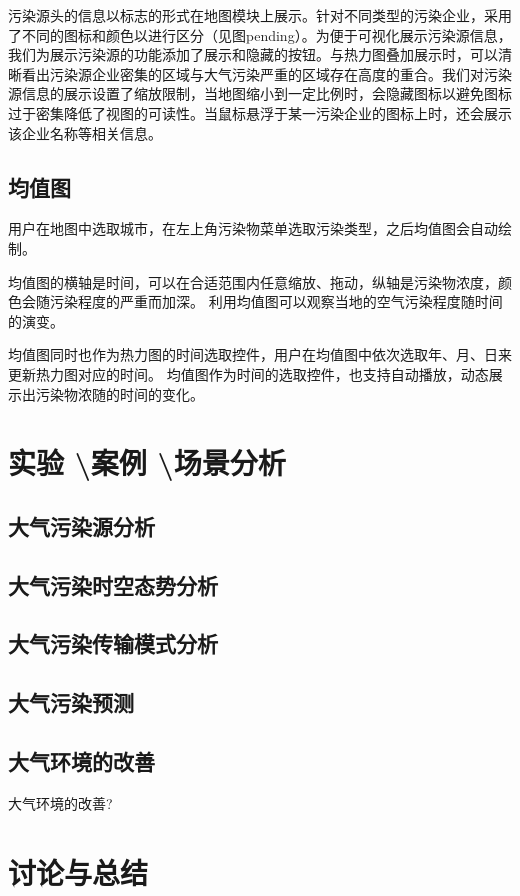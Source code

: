 \documentclass[UTF8]{ctexrep}
\begin{document}
    污染源头的信息以标志的形式在地图模块上展示。针对不同类型的污染企业，采用了不同的图标和颜色以进行区分（见图pending）。为便于可视化展示污染源信息，我们为展示污染源的功能添加了展示和隐藏的按钮。与热力图叠加展示时，可以清晰看出污染源企业密集的区域与大气污染严重的区域存在高度的重合。我们对污染源信息的展示设置了缩放限制，当地图缩小到一定比例时，会隐藏图标以避免图标过于密集降低了视图的可读性。当鼠标悬浮于某一污染企业的图标上时，还会展示该企业名称等相关信息。\\

    \subsection{均值图}
    用户在地图中选取城市，在左上角污染物菜单选取污染类型，之后均值图会自动绘制。
    \par
    均值图的横轴是时间，可以在合适范围内任意缩放、拖动，纵轴是污染物浓度，颜色会随污染程度的严重而加深。
    利用均值图可以观察当地的空气污染程度随时间的演变。
    \par
    均值图同时也作为热力图的时间选取控件，用户在均值图中依次选取年、月、日来更新热力图对应的时间。
    均值图作为时间的选取控件，也支持自动播放，动态展示出污染物浓随的时间的变化。
    \par

    \section{实验 \textbackslash 案例 \textbackslash 场景分析}

    \subsection{大气污染源分析}

    \subsection{大气污染时空态势分析}

    \subsection{大气污染传输模式分析}

    \subsection{大气污染预测}

    \subsection{大气环境的改善}
    大气环境的改善?
    \par

    \section{讨论与总结}
    
\end{document}
